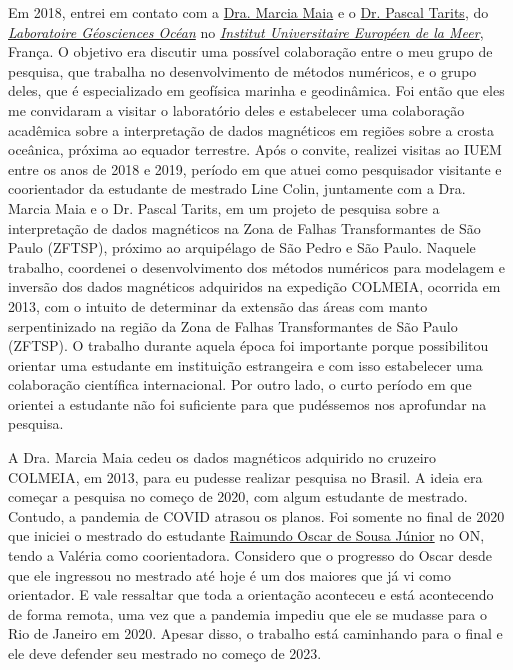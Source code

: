 Em 2018, entrei em contato com a 
\href{https://www-iuem.univ-brest.fr/lgo/equipe/maia-marcia-do-carmo/}{Dra. Marcia Maia} 
e o 
\href{https://www-iuem.univ-brest.fr/lgo/equipe/tarits-pascal/}{Dr. Pascal Tarits},
do 
\href{https://www-iuem.univ-brest.fr/lgo/le-labo/}{\textit{Laboratoire Géosciences Océan}} 
no \href{https://www-iuem.univ-brest.fr/}{\textit{Institut Universitaire Européen de la Meer}}, França. O objetivo era discutir uma possível colaboração entre o meu grupo de 
pesquisa, que trabalha no desenvolvimento de métodos numéricos, e o grupo deles,
que é especializado em geofísica marinha e geodinâmica.
Foi então que eles me convidaram a visitar o laboratório deles e estabelecer uma colaboração
acadêmica sobre a interpretação de dados magnéticos em regiões sobre a crosta oceânica,
próxima ao equador terrestre. Após o convite, realizei visitas ao IUEM entre os anos de
2018 e 2019, período em que atuei como pesquisador visitante e 
coorientador da estudante de mestrado Line Colin, juntamente
com a Dra. Marcia Maia e o Dr. Pascal Tarits, em um projeto de pesquisa sobre a 
interpretação de dados magnéticos na Zona de Falhas Transformantes de São
Paulo (ZFTSP), próximo ao arquipélago de São Pedro e São Paulo.
Naquele trabalho, coordenei o desenvolvimento dos métodos numéricos para modelagem
e inversão dos dados magnéticos adquiridos na expedição
COLMEIA, ocorrida em 2013, com o intuito de determinar da extensão das áreas com manto 
serpentinizado na região da Zona de Falhas Transformantes de São Paulo (ZFTSP). 
O trabalho durante aquela época foi importante porque possibilitou orientar uma
estudante em instituição estrangeira e com isso estabelecer uma colaboração científica
internacional. Por outro lado, o curto período em que orientei a estudante não foi
suficiente para que pudéssemos nos aprofundar na pesquisa. 

A Dra. Marcia Maia cedeu os dados magnéticos adquirido no cruzeiro COLMEIA, em 2013,
para eu pudesse realizar pesquisa no Brasil. A ideia era começar a pesquisa no começo
de 2020, com algum estudante de mestrado. Contudo, a pandemia de COVID atrasou os planos.
Foi somente no final de 2020 que iniciei o mestrado do estudante
\href{https://lattes.cnpq.br/5355013713549584}{Raimundo Oscar de Sousa Júnior} no ON,
tendo a Valéria como coorientadora. Considero que o progresso do Oscar desde que 
ele ingressou no mestrado até hoje é um dos maiores que já vi como orientador.
E vale ressaltar que toda a orientação aconteceu e está acontecendo de forma remota,
uma vez que a pandemia impediu que ele se mudasse para o Rio de Janeiro em 2020.
Apesar disso, o trabalho está caminhando para o final e ele deve defender seu mestrado 
no começo de 2023.

